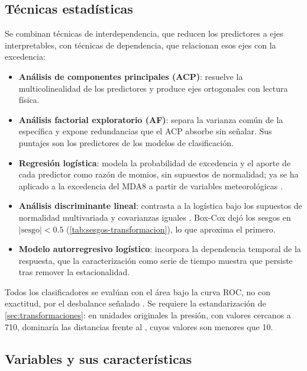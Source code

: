 \subsection{Técnicas estadísticas}
\label{sec:obj:tecnicas}

Se combinan técnicas de interdependencia, que reducen los predictores a ejes
interpretables, con técnicas de dependencia, que relacionan esos ejes con la
excedencia:

\begin{itemize}
  \item \textbf{Análisis de componentes principales (ACP)}: resuelve la
    multicolinealidad de los predictores y produce ejes ortogonales con
    lectura física.
  \item \textbf{Análisis factorial exploratorio (AF)}: separa la varianza
    común de la específica y expone redundancias que el ACP absorbe sin
    señalar. Sus puntajes son los predictores de los modelos de
    clasificación.
  \item \textbf{Regresión logística}: modela la probabilidad de excedencia y
    el aporte de cada predictor como razón de momios, sin supuestos de
    normalidad; ya se ha aplicado a la excedencia del MDA8 a partir de
    variables meteorológicas \parencite{otero2016}.
  \item \textbf{Análisis discriminante lineal}: contrasta a la logística bajo
    los supuestos de normalidad multivariada y covarianzas iguales
    \parencite{hosmer2013}. Box-Cox dejó los sesgos en $|\text{sesgo}|<0.5$
    (\cref{tab:sesgos-transformacion}), lo que aproxima el primero.
  \item \textbf{Modelo autorregresivo logístico}: incorpora la dependencia
    temporal de la respuesta, que la caracterización como serie de tiempo
    muestra que persiste tras remover la estacionalidad.
\end{itemize}

Todos los clasificadores se evalúan con el área bajo la curva ROC, no con
exactitud, por el desbalance señalado \parencite{saito2015}. Se requiere la
estandarización de \cref{sec:transformaciones}: en unidades originales la
presión, con valores cercanos a 710, dominaría las distancias frente al
, cuyos valores son menores que 10.

\subsection{Variables y sus características}
\label{sec:obj:variables}


